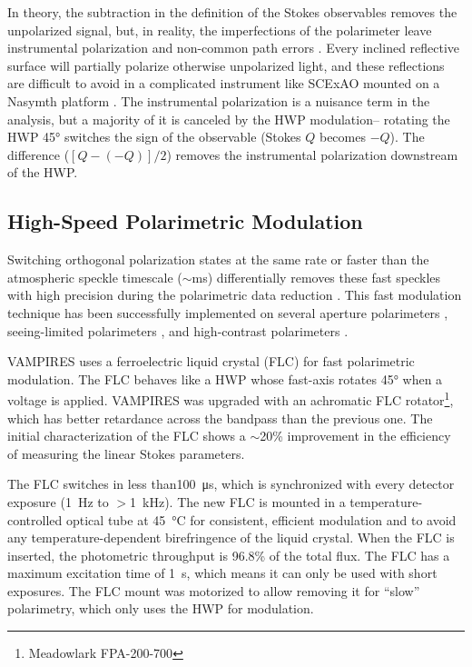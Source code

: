 In theory, the subtraction in the definition of the Stokes observables removes the unpolarized signal, but, in reality, the imperfections of the polarimeter leave instrumental polarization and non-common path errors \citep{kuhn_imaging_2001,tinbergen_astronomical_2005}. Every inclined reflective surface will partially polarize otherwise unpolarized light, and these reflections are difficult to avoid in a complicated instrument like SCExAO mounted on a Nasymth platform \citep{tinbergen_accurate_2007}. The instrumental polarization is a nuisance term in the analysis, but a majority of it is canceled by the HWP modulation-- rotating the HWP \ang{45} switches the sign of the observable (Stokes $Q$ becomes $-Q$). The difference ($[Q - (-Q)]/2$) removes the instrumental polarization downstream of the HWP.

\subsection{High-Speed Polarimetric Modulation}

Switching orthogonal polarization states at the same rate or faster than the atmospheric speckle timescale ($\sim$\si{\milli\second}) differentially removes these fast speckles with high precision during the polarimetric data reduction \citep{kemp_piezo-optical_1969}. This fast modulation technique has been successfully implemented on several aperture polarimeters \citep{rodenhuis_extreme_2012,harrington_innopol_2014,bailey_high-sensitivity_2015,bailey_high-precision_2017,bailey_hippi-2_2020}, seeing-limited polarimeters \citep{safonov_speckle_2017,bailey_picsarr_2023}, and high-contrast polarimeters \citep{norris_vampires_2015,schmid_spherezimpol_2018}. 

VAMPIRES uses a ferroelectric liquid crystal (FLC) for fast polarimetric modulation. The FLC behaves like a HWP whose fast-axis rotates \ang{45} when a voltage is applied. VAMPIRES was upgraded with an achromatic FLC rotator\footnote{Meadowlark FPA-200-700}, which has better retardance across the bandpass than the previous one. The initial characterization of the FLC shows a $\sim$20\% improvement in the efficiency of measuring the linear Stokes parameters.

The FLC switches in less than\SI{100}{\micro\second}, which is synchronized with every detector exposure (\SI{1}{\hertz} to $>$\SI{1}{\kilo\hertz}). The new FLC is mounted in a temperature-controlled optical tube at \SI{45}{\celsius} for consistent, efficient modulation and to avoid any temperature-dependent birefringence of the liquid crystal. When the FLC is inserted, the photometric throughput is 96.8\% of the total flux. The FLC has a maximum excitation time of \SI{1}{\second}, which means it can only be used with short exposures. The FLC mount was motorized to allow removing it for ``slow'' polarimetry, which only uses the HWP for modulation.


